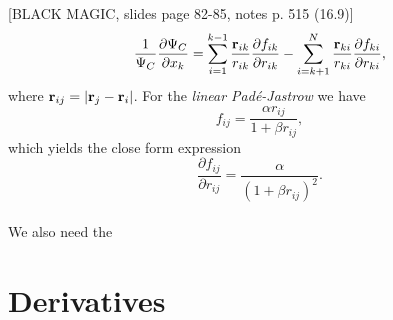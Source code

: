 [BLACK MAGIC, slides page 82-85, notes p. 515 (16.9)] \\

\[
    \frac{1}{\Psi_C} \frac{\partial \Psi_C}{\partial x_k}
    = \sum_{i=1}^{k-1} \frac{\mathbf{r}_{ik}}{r_{ik}} \frac{\partial f_{ik}}{\partial r_{ik}} - \sum_{i = k+1}^{N} \frac{\mathbf{r}_{ki}}{r_{ki}} \frac{\partial f_{ki}}{\partial r_{ki}},
\]
where $\mathbf{r}_{ij} = |\mathbf{r}_j - \mathbf{r}_i|$. For the {\it linear Pad\'e-Jastrow} we have
\[
    f_{ij} = \frac{\alpha r_{ij}}{1+\beta r_{ij}},
\]
which yields the close form expression
\[
    \frac{\partial f_{ij}}{\partial r_{ij}} = \frac{\alpha}{(1 + \beta r_{ij})^2}.
\] \\

We also need the 










\section*{Derivatives}

